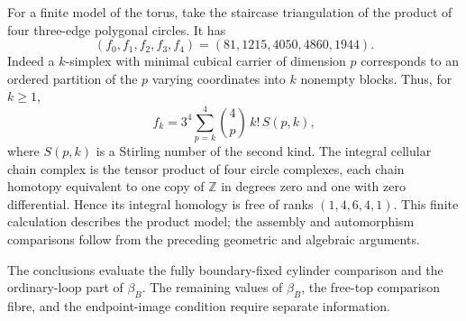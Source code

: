 For a finite model of the torus, take the staircase
triangulation of the product of four three-edge
polygonal circles.  It has
\[
 (f_0,f_1,f_2,f_3,f_4)=(81,1215,4050,4860,1944).
\]
Indeed a $k$-simplex with minimal cubical carrier of
dimension $p$ corresponds to an ordered partition
of the $p$ varying coordinates into $k$ nonempty
blocks.  Thus, for $k\geq1$,
\[
 f_k=3^4\sum_{p=k}^4\binom4p\,k!\,S(p,k),
\]
where $S(p,k)$ is a Stirling number of the second kind.
The integral cellular chain complex is the tensor
product of four circle complexes, each chain homotopy
equivalent to one copy of $\mathbb Z$ in degrees zero
and one with zero differential.  Hence its integral
homology is free of ranks $(1,4,6,4,1)$.
This finite calculation describes the product model;
the assembly and automorphism comparisons follow from
the preceding geometric and algebraic arguments.

The conclusions evaluate the fully boundary-fixed
cylinder comparison and the ordinary-loop part of
$\beta_B$.  The remaining values of $\beta_B$, the
free-top comparison fibre, and the endpoint-image
condition require separate information.
